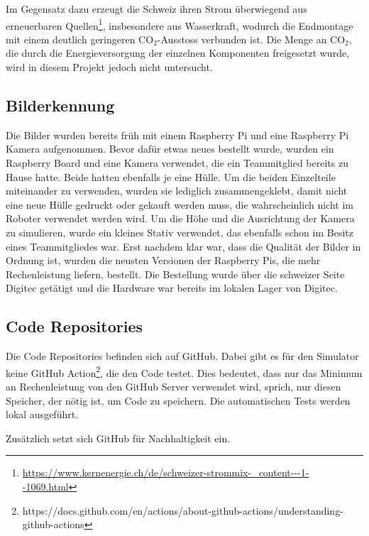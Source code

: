 Im Gegensatz dazu erzeugt die Schweiz ihren Strom überwiegend aus erneuerbaren Quellen\footnote{\url{https://www.kernenergie.ch/de/schweizer-strommix-_content---1--1069.html}}, insbesondere aus Wasserkraft, wodurch die Endmontage mit einem deutlich geringeren CO$_{2}$-Ausstoss verbunden ist. Die Menge an CO$_{2}$, die durch die Energieversorgung der einzelnen Komponenten freigesetzt wurde, wird in diesem Projekt jedoch nicht untersucht.




\subsection{Bilderkennung}

Die Bilder wurden bereits früh mit einem Raspberry Pi und eine Raspberry Pi Kamera aufgenommen. Bevor dafür etwas neues bestellt wurde, wurden ein Raspberry Board und eine Kamera verwendet, die ein Teammitglied bereits zu Hause hatte. Beide hatten ebenfalls je eine Hülle.
Um die beiden Einzelteile miteinander zu verwenden, wurden sie lediglich zusammengeklebt, damit nicht eine neue Hülle gedruckt oder gekauft werden muss, die wahrscheinlich nicht im Roboter verwendet werden wird.
Um die Höhe und die Ausrichtung der Kamera zu simulieren, wurde ein kleines Stativ verwendet, das ebenfalls schon im Besitz eines Teammitgliedes war.
Erst nachdem klar war, dass die Qualität der Bilder in Ordnung ist, wurden die neusten Versionen der Raspberry Pis, die mehr Rechenleistung liefern, bestellt. Die Bestellung wurde über die schweizer Seite Digitec getätigt und die Hardware war bereits im lokalen Lager von Digitec. 

\subsection{Code Repositories}

Die Code Repositories befinden sich auf GitHub. Dabei gibt es für den Simulator keine GitHub Action\footnote{https://docs.github.com/en/actions/about-github-actions/understanding-github-actions}, die den Code testet. Dies bedeutet, dass nur das Minimum an Rechenleistung von den GitHub Server verwendet wird, sprich, nur diesen Speicher, der nötig ist, um Code zu speichern. Die automatischen Tests werden lokal ausgeführt.

Zusätzlich setzt sich GitHub für Nachhaltigkeit ein.\cite{github-sustainability}

